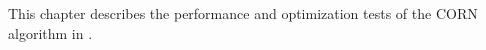 This chapter describes
  the performance and optimization tests
  of the \ac{CORN} algorithm in \dsea{}.

